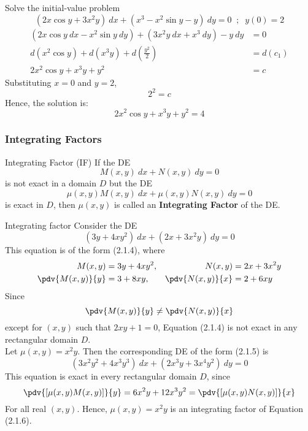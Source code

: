 \begin{example}{Solve the initial-value problem \[
        (2x\cos y + 3x^2y) \: d{x} + (x^3 - x^2\sin y - y) \: d{y} = 0 \;\;;\;\; y(0) = 2
    \] \vspace{-40pt}
}{}
    \begin{align*}
        (2x\cos y \: dx - x^2\sin y \: d{y}) + (3x^2y \: d{x} + x^3 \: d{y}) - y \: d{y} &= 0 \\
        d(x^2 \cos y) + d(x^3y) + d(\frac{y^2}{2}) &= d(c_1) \\
        2x^2 \cos y + x^3y + y^2 &= c 
    \end{align*}
    Substituting $x=0$ and $y=2$,
    \[ 2^2 = c \]
    Hence, the solution is: \[
        2x^2 \cos y + x^3y + y^2 = 4 
    \]
\end{example}

\vspace{20pt}
\subsubsection{Integrating Factors}

\begin{definition}{Integrating Factor (IF)}{}
    If the DE
    \begin{equation}
        M(x,y) \: d{x} + N(x,y) \: d{y} = 0
    \end{equation}
    is not exact in a domain $D$ but the DE
    \begin{equation}
        \mu(x,y)M(x,y) \: d{x} + \mu(x,y)N(x,y) \: d{y} = 0
    \end{equation}
    is exact in $D$, then $\mu(x,y)$ is called an \textbf{Integrating Factor} of the DE.
\end{definition}

\begin{example}{Integrating factor}{}
    Consider the DE
    \begin{equation}
        (3y + 4xy^2) \: d{x} + (2x + 3x^2y) \: d{y} = 0
    \end{equation}
    This equation is of the form (2.1.4), where
     \begin{align*}
        M(x,y) &= 3y+4xy^2 ,& N(x,y) &= 2x+3x^2y \\
        \pdv{M(x,y)}{y} &= 3+8xy ,& \pdv{N(x,y)}{x} &= 2+6xy
    \end{align*}
    Since \[
        \pdv{M(x,y)}{y} \neq \pdv{N(x,y)}{x}
    \] except for $(x,y)$ such that $2xy + 1 = 0$, Equation (2.1.4) is not exact in any rectangular domain $D$. \\
    Let $\mu(x,y) = x^2y$. Then the corresponding DE of the form (2.1.5) is \[
        (3x^2y^2 + 4x^3y^3) \: d{x} + (2x^3y + 3x^4y^2) \: d{y} = 0
    \]
    This equation is exact in every rectangular domain $D$, since
    \[
        \pdv{[\mu(x,y)M(x,y)]}{y} = 6x^2y+12x^3y^2 = \pdv{[\mu(x,y)N(x,y)]}{x} 
    \]
    For all real $(x,y)$. Hence, $\mu(x,y) = x^2y$ is an integrating factor of Equation (2.1.6).
\end{example}

